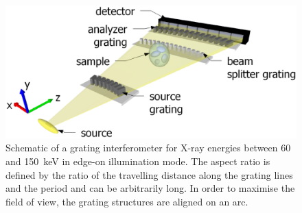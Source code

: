 \documentclass{pnastwo}
\begin{document}







\begin{figure}
    \includegraphics[width=.5\textwidth]{figures/figure1.eps}
    \caption{Schematic of a grating
        interferometer for X-ray energies between 60 and
        \SI{150}{\kilo\electronvolt} in edge-on illumination mode. The
        aspect ratio is defined by the ratio of the travelling distance along the
        grating lines and the period and can be arbitrarily long. In order to maximise
        the field of view, the grating structures are aligned on an
    arc.}
    \label{Fig:schematic}
\end{figure}
\end{document}

